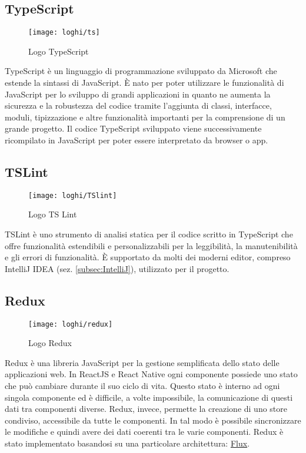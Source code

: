 \subsection{TypeScript} \label{subsec:tslint}
\begin{figure}[H] 
	\centering
	\texttt{[image: loghi/ts]}
	\caption{Logo TypeScript}
\end{figure}
TypeScript è un linguaggio di programmazione sviluppato da Microsoft che 
estende la sintassi di JavaScript.  È nato per poter utilizzare le funzionalità di 
JavaScript per lo sviluppo di grandi applicazioni in quanto ne aumenta la 
sicurezza e la robustezza del codice tramite l'aggiunta di classi, interfacce, 
moduli, tipizzazione e altre funzionalità importanti per la comprensione di un 
grande progetto. 
Il codice TypeScript sviluppato viene successivamente ricompilato in JavaScript 
per poter essere interpretato da browser o app.

\subsection{TSLint}
\begin{figure}[H] 
	\centering
	\texttt{[image: loghi/TSlint]}
	\caption{Logo TS Lint}
\end{figure}
TSLint è uno strumento di analisi statica per il codice scritto in TypeScript 
che offre funzionalità estendibili e personalizzabili per la leggibilità, la 
manutenibilità e gli errori di funzionalità. 
È supportato da molti dei moderni editor, compreso IntelliJ IDEA (sez. 
\ref{subsec:IntelliJ}), utilizzato per il progetto.

\subsection{Redux} \label{subsec:Redux}
\begin{figure}[H] 
	\centering
	\texttt{[image: loghi/redux]}
	\caption{Logo Redux}
\end{figure}
Redux è una libreria JavaScript per la gestione semplificata dello stato delle 
applicazioni web. In ReactJS e React Native ogni componente possiede uno stato 
che può cambiare durante il suo ciclo di vita. Questo stato è interno ad ogni 
singola componente ed è difficile, a volte impossibile, la comunicazione di questi 
dati tra componenti diverse. 
Redux, invece, permette la creazione di uno store condiviso, accessibile da tutte 
le componenti. In tal modo è possibile sincronizzare le modifiche e quindi 
avere dei dati coerenti tra le varie componenti. 
Redux è stato implementato basandosi su una particolare architettura: 
\hyperref[subsec:flux]{Flux}.

